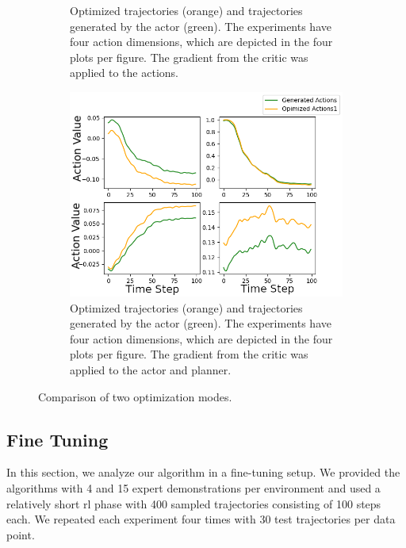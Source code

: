 \begin{figure}[htbp]
\begin{subfigure}[t]{0.45\textwidth}
      \caption{Optimized trajectories (orange) and trajectories generated by the actor (green). 
      The experiments have four action dimensions, which are depicted in the 
      four plots per figure. 
      The gradient from the critic was applied to the actions.}
      \label{fig:direct_actions}
    \end{subfigure}
    \hfill
    \begin{subfigure}[t]{0.45\textwidth}
      \includegraphics[width=\textwidth]{images/Plan_vs_Actions/changes_axis/plans_actor_0_axis.png}
      \caption{Optimized trajectories (orange) and trajectories generated by the actor (green). 
      The experiments have four action dimensions, which are depicted in the 
      four plots per figure. The gradient from the critic was applied to the actor and planner.}
      \label{fig:ac_pl_actions}
    \end{subfigure}
    \caption{Comparison of two optimization modes.}
    \label{fig:action_vs_actor}
\end{figure}

\subsection{Fine Tuning}
\label{sec:fine_tuning}
In this section, we analyze our algorithm in a fine-tuning setup. We provided the algorithms with 4 and 15 expert demonstrations per 
environment and used a relatively short \ac{rl} phase with 400 sampled trajectories consisting of 100 steps each. We 
repeated each experiment four times with 30 test trajectories per data point.\\

